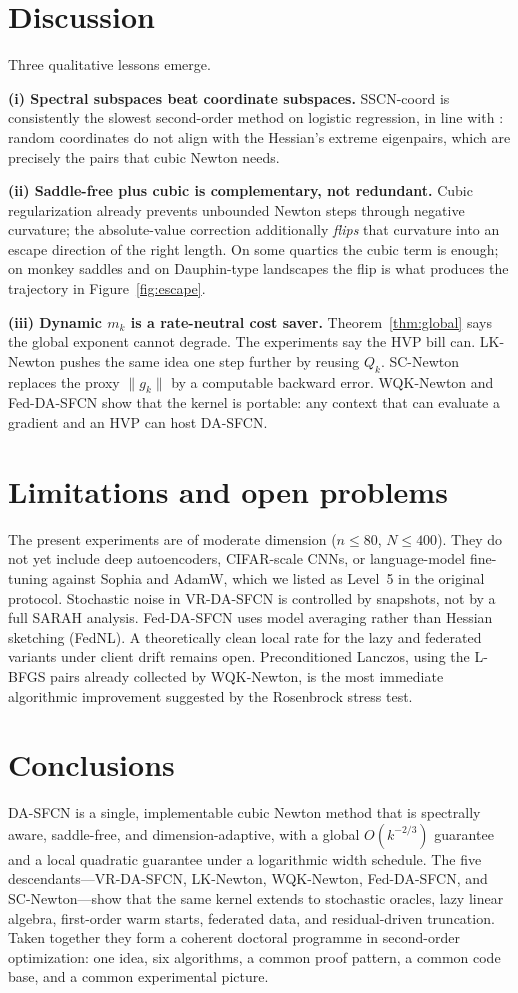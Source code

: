 \documentclass[11pt,a4paper]{article}
\theoremstyle{definition}
\begin{document}
\section{Discussion}
Three qualitative lessons emerge.

\textbf{(i) Spectral subspaces beat coordinate subspaces.}
SSCN-coord is consistently the slowest second-order method on logistic
regression, in line with \cite{jiang2024}: random coordinates do not
align with the Hessian's extreme eigenpairs, which are precisely the
pairs that cubic Newton needs.

\textbf{(ii) Saddle-free plus cubic is complementary, not redundant.}
Cubic regularization already prevents unbounded Newton steps through
negative curvature; the absolute-value correction additionally
\emph{flips} that curvature into an escape direction of the right length.
On some quartics the cubic term is enough; on monkey saddles and on
Dauphin-type landscapes the flip is what produces the trajectory in
Figure~\ref{fig:escape}.

\textbf{(iii) Dynamic $m_k$ is a rate-neutral cost saver.}
Theorem~\ref{thm:global} says the global exponent cannot degrade.
The experiments say the HVP bill can. LK-Newton pushes the same idea
one step further by reusing $Q_k$. SC-Newton replaces the proxy
$\|g_k\|$ by a computable backward error. WQK-Newton and Fed-DA-SFCN
show that the kernel is portable: any context that can evaluate a
gradient and an HVP can host DA-SFCN.

\section{Limitations and open problems}
The present experiments are of moderate dimension ($n\le 80$, $N\le 400$).
They do not yet include deep autoencoders, CIFAR-scale CNNs, or language-model
fine-tuning against Sophia \cite{liu2023} and AdamW, which we listed as
Level~5 in the original protocol. Stochastic noise in VR-DA-SFCN is
controlled by snapshots, not by a full SARAH analysis. Fed-DA-SFCN uses
model averaging rather than Hessian sketching (FedNL).
A theoretically clean local rate for the lazy and federated variants
under client drift remains open. Preconditioned Lanczos, using the
L-BFGS pairs already collected by WQK-Newton, is the most immediate
algorithmic improvement suggested by the Rosenbrock stress test.

\section{Conclusions}
DA-SFCN is a single, implementable cubic Newton method that is
spectrally aware, saddle-free, and dimension-adaptive, with a global
$O(k^{-2/3})$ guarantee and a local quadratic guarantee under a
logarithmic width schedule. The five descendants---VR-DA-SFCN, LK-Newton,
WQK-Newton, Fed-DA-SFCN, and SC-Newton---show that the same kernel
extends to stochastic oracles, lazy linear algebra, first-order warm
starts, federated data, and residual-driven truncation.
Taken together they form a coherent doctoral programme in second-order
optimization: one idea, six algorithms, a common proof pattern, a common
code base, and a common experimental picture.
\end{document}
